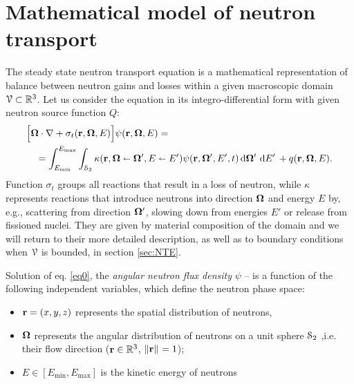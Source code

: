 \ifpdf
	\graphicspath{{2/pic/PNG/}{2/pic/PDF/}{2/pic/}}
\else
	\graphicspath{{2/pic/EPS/}{2/pic/}}
\fi

\chapter{Mathematical model of neutron transport}\label{chap:nte-review}


The steady state neutron transport equation is a mathematical representation of balance between neutron gains and losses
within a given macroscopic domain $\VV\subset\R[3]$. Let us consider the equation in its integro-differential form with
given neutron source function $Q$:
\begin{equation}\label{eq0}
  \begin{multlined}
    \Bigl[
      \bomega\cdot\grad + \sigma_t(\br,\bomega,E)
    \Bigr]
    \psi(\br,\bomega,E) =\\
    = \intE[']{\Emin}{\Emax}{\intA[']{\kappa(\br,\bomega\sla\bomega',E\sla E')\psi(\br,\bomega',E',t)}}  + 
    \src(\br,\bomega,E).
  \end{multlined}  
\end{equation}
Function $\sigma_t$ groups all reactions that result in a loss of neutron, while $\kappa$ represents reactions that
introduce neutrons into direction $\bomega$ and energy $E$ by, e.g., scattering from direction $\bomega'$, slowing down
from energies $E'$ or release from fissioned nuclei.
They are given by material composition of the domain and we will return to their more detailed description, as
well as to boundary conditions when $\VV$ is bounded, in section \ref{sec:NTE}.

Solution of eq. \eqref{eq0}, the \textit{angular neutron flux density} $\psi$ -- is a function of the following
independent variables, which define the neutron phase space:
\begin{itemize}
 	\item $\br = (x,y,z)$
 	 represents the spatial distribution of
 	 neutrons,
 	\item $\bomega$ represents the angular
 	distribution of neutrons on a unit sphere $\Sphere$ ,i.e. their flow direction ($\br\in\R[3]$, $\norm{\br}=1$);
 	\item $E\in [E_{\text{min}},E_{\text{max}}]$ is the kinetic
 	energy of neutrons
\end{itemize}

